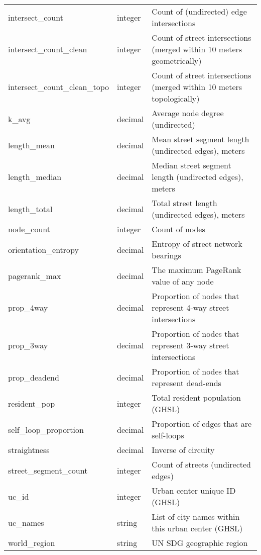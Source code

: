\documentclass[12pt,letterpaper]{article} %
\begin{document}
\begin{table}[htbp]
\begin{tabular}{p{3.8cm} p{1.2cm} p{7.6cm}}
        intersect\_count & integer & Count of (undirected) edge intersections \\
        intersect\_count\_clean & integer & Count of street intersections (merged within 10 meters geometrically) \\
        intersect\_count\_clean\_topo & integer & Count of street intersections (merged within 10 meters topologically) \\
        k\_avg & decimal & Average node degree (undirected) \\
        length\_mean & decimal & Mean street segment length (undirected edges), meters \\
        length\_median & decimal & Median street segment length (undirected edges), meters \\
        length\_total & decimal & Total street length (undirected edges), meters \\
        node\_count & integer & Count of nodes \\
        orientation\_entropy & decimal & Entropy of street network bearings \\
        pagerank\_max & decimal & The maximum PageRank value of any node \\
        prop\_4way & decimal & Proportion of nodes that represent 4-way street intersections \\
        prop\_3way & decimal & Proportion of nodes that represent 3-way street intersections \\
        prop\_deadend & decimal & Proportion of nodes that represent dead-ends \\
        resident\_pop & integer & Total resident population (GHSL) \\
        self\_loop\_proportion & decimal & Proportion of edges that are self-loops \\
        straightness & decimal & Inverse of circuity \\
        street\_segment\_count & integer & Count of streets (undirected edges) \\
        uc\_id & integer & Urban center unique ID (GHSL) \\
        uc\_names & string & List of city names within this urban center (GHSL) \\
        world\_region & string & UN SDG geographic region \\
        \bottomrule
    \end{tabular}
\end{table}
\end{document}
